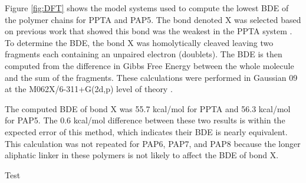 \documentclass[journal=langd5,manuscript=article]{achemso}
\begin{document}
Figure \ref{fig:DFT} shows the model systems used to compute the 
lowest BDE of the polymer chains for PPTA and PAP5.
The bond denoted X was selected based on previous work 
that showed this bond was the weakest in the PPTA system \cite{mercer2017molecular}.
To determine the BDE, the bond X was homolytically cleaved leaving
two fragments each containing an unpaired electron (doublets).
The BDE is then computed from the
difference in Gibbs Free Energy between the whole
molecule and the sum of the fragments.
These calculations were performed in Gaussian 09 \cite{g09}
at the M062X/6-311+G(2d,p) level of theory \cite{zhao_2008,mclean_1980}.

The computed BDE of bond X was 55.7 kcal/mol for PPTA and
56.3 kcal/mol for PAP5.
The 0.6 kcal/mol difference between these two results is
within the expected error of this method, which indicates
their BDE is nearly equivalent.
This calculation was not repeated for PAP6, PAP7, and PAP8 because
the longer aliphatic linker in these polymers is not likely to affect the BDE of bond X.

Test
\FloatBarrier

\end{document}

